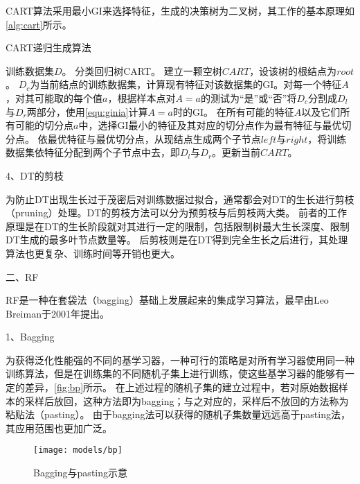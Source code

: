 CART算法采用最小GI来选择特征，生成的决策树为二叉树，其工作的基本原理如\autoref{alg:cart}所示。
\begin{breakablealgorithm}
      \caption[CART生成算法]{CART递归生成算法\cite{Li2017}}
      \label{alg:cart}
      \begin{algorithmic}[1] %
            \Require 训练数据集$D$。
            \Ensure 分类回归树CART。
            \State 建立一颗空树$CART$，设该树的根结点为$root$。
                  \State $D_c$为当前结点的训练数据集，计算现有特征对该数据集的GI。对每一个特征$A$，对其可能取的每个值$a$，根据样本点对$A=a$的测试为“是”或“否”将$D_c$分割成$D_l$与$D_r$两部分，使用\autoref{equ:ginia}计算$A=a$时的GI。
                  \State 在所有可能的特征$A$以及它们所有可能的切分点$a$中，选择GI最小的特征及其对应的切分点作为最有特征与最优切分点。
                  \State 依最优特征与最优切分点，从现结点生成两个子节点$left$与$right$，将训练数据集依特征分配到两个子节点中去，即$D_l$与$D_r$。更新当前$CART$。
                  \State {}
                  \Else    
                  \State {}
                  \State {}
                  \EndIf
            \EndFunction
      \end{algorithmic}
\end{breakablealgorithm}

4、DT的剪枝

为防止DT出现生长过于茂密后对训练数据过拟合，通常都会对DT的生长进行剪枝（pruning）处理。DT的剪枝方法可以分为预剪枝与后剪枝两大类。
前者的工作原理是在DT的生长阶段就对其进行一定的限制，包括限制树最大生长深度、限制DT生成的最多叶节点数量等。
后剪枝则是在DT得到完全生长之后进行，其处理算法也更复杂、训练时间等开销也更大\cite{Zhou2016,Liu2018}。

二、RF

RF是一种在套袋法（bagging）基础上发展起来的集成学习算法，最早由Leo Breiman于2001年提出\cite{breiman2001}。

1、Bagging

为获得泛化性能强的不同的基学习器，一种可行的策略是对所有学习器使用同一种训练算法，但是在训练集的不同随机子集上进行训练，使这些基学习器的能够有一定的差异，\autoref{fig:bp}所示。
在上述过程的随机子集的建立过程中，若对原始数据样本的采样后放回，这种方法即为bagging；与之对应的，采样后不放回的方法称为粘贴法（pasting）\cite{Aurélien2018,Zhou2016}。
由于bagging法可以获得的随机子集数量远远高于pasting法，其应用范围也更加广泛。
\begin{figure}[htbp]
      \centering
      \texttt{[image: models/bp]}
      \caption[Bagging与pasting示意]{\label{fig:bp}Bagging与pasting示意\cite{Aurélien2018}}
\end{figure}

